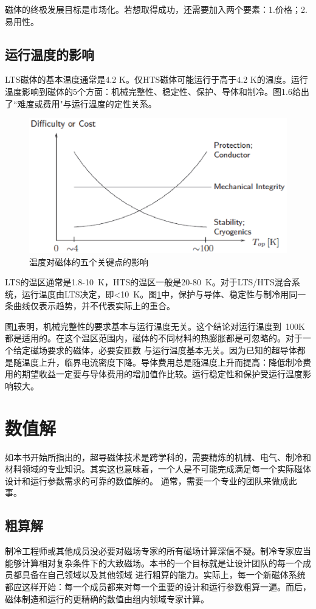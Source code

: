 磁体的终极发展目标是市场化。若想取得成功，还需要加入两个要素：1.价格；2.易用性。

\subsection{运行温度的影响}
LTS磁体的基本温度通常是4.2 K。仅HTS磁体可能运行于高于4.2 K的温度。运行温度影响到磁体的5个方面：机械完整性、稳定性、保护、导体和制冷。图1.6给出了``难度或费用"与运行温度的定性关系。
\begin{figure}
  \centering
 \includegraphics[scale=0.6]{chpt1/figs/fig1.6.eps}
  \caption{
温度对磁体的五个关键点的影响
}\label{temperatureeffect}
\end{figure}
LTS的温区通常是1.8-10\ K，HTS的温区一般是20-80\ K。对于LTS/HTS混合系统，运行温度由LTS决定，即<10\ K。图\ref{temperatureeffect}中，保护与导体、稳定性与制冷用同一条曲线仅表示趋势，并不代表实际上的重合。

图\ref{temperatureeffect}表明，机械完整性的要求基本与运行温度无关。这个结论对运行温度到~100K都是适用的。在这个温区范围内，磁体的不同材料的热膨胀都是可忽略的。对于一个给定磁场要求的磁体，必要安匝数
与运行温度基本无关。因为已知的超导体都是随温度上升，临界电流密度下降。导体费用总是随温度上升而提高：降低制冷费用的期望收益一定要与导体费用的增加值作比较。运行稳定性和保护受运行温度影响较大。

\section{数值解}
如本书开始所指出的，超导磁体技术是跨学科的，需要精炼的机械、电气、制冷和材料领域的专业知识。其实这也意味着，一个人是不可能完成满足每一个实际磁体设计和运行参数需求的可靠的数值解的。
通常，需要一个专业的团队来做成此事。
\subsection{粗算解}
制冷工程师或其他成员没必要对磁场专家的所有磁场计算深信不疑。制冷专家应当能够计算相对复杂条件下的大致磁场。本书的一个目标就是让设计团队的每一个成员都具备在自己领域以及其他领域
进行粗算的能力。实际上，每一个新磁体系统都应这样开始：每一个成员都来对每一个重要的设计和运行参数粗算一遍。而后，磁体制造和运行的更精确的数值由组内领域专家计算。

